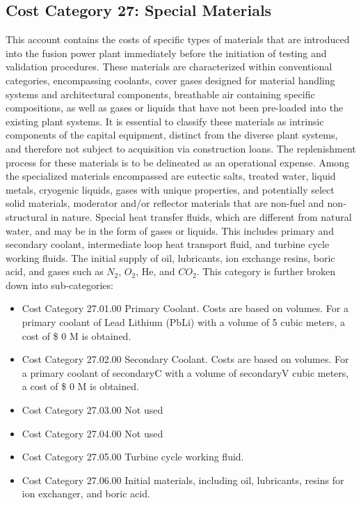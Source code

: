 \subsection{Cost Category 27: Special Materials}

This account contains the costs of specific types of materials that are introduced into the fusion power plant immediately before the initiation of testing and validation procedures. These materials are characterized within conventional categories, encompassing coolants, cover gases designed for material handling systems and architectural components, breathable air containing specific compositions, as well as gases or liquids that have not been pre-loaded into the existing plant systems. It is essential to classify these materials as intrinsic components of the capital equipment, distinct from the diverse plant systems, and therefore not subject to acquisition via construction loans. The replenishment process for  these materials is to be delineated as an operational expense. Among the specialized materials encompassed are eutectic salts, treated water, liquid metals,  cryogenic liquids, gases with unique properties, and potentially select solid materials, moderator and/or reflector materials that are non-fuel and non-structural in nature. Special heat transfer fluids, which are different from natural water, and may be in the form of gases or liquids. This includes primary and secondary coolant, intermediate loop heat transport fluid, and turbine cycle working fluids. The initial supply of oil, lubricants, ion exchange resins, boric acid, and gases such as $N_2$, $O_2$, He, and $CO_2$.
This category is further broken down into sub-categories:

\begin{itemize}
    \item Cost Category 27.01.00 Primary Coolant. Costs are based on volumes. For a primary coolant of Lead Lithium (PbLi) with a volume of 5 cubic meters, a cost of \$ 0 M is obtained.  
    \item Cost Category 27.02.00 Secondary Coolant. Costs are based on volumes. For a primary coolant of secondaryC with a volume of secondaryV cubic meters, a cost of \$ 0 M is obtained.
    \item Cost Category 27.03.00 Not used
    \item Cost Category 27.04.00 Not used
    \item Cost Category 27.05.00 Turbine cycle working fluid.
    \item Cost Category 27.06.00 Initial materials, including oil, lubricants, resins for ion exchanger, and boric acid.
\end{itemize}

